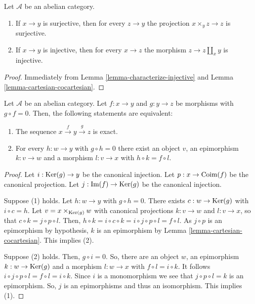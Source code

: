\begin{lemma}
\label{lemma-epimo-unive-abeli-categ}
Let $\mathcal{A}$ be an abelian category.
\begin{enumerate}
\item If $x \to y$ is surjective, then for
every $z \to y$ the
projection $x \times_y z \to z$ is
surjective.
\item If $x \to y$ is injective, then for
every $x \to z$ the
morphism $z \to z \amalg_x y$ is injective.
\end{enumerate}
\end{lemma}

\begin{proof}
Immediately from Lemma
\ref{lemma-characterize-injective} and
Lemma \ref{lemma-cartesian-cocartesian}.
\end{proof}

\begin{lemma}
\label{lemma-check-exactness-fibre-product}
Let $\mathcal{A}$ be an abelian category. Let
$f:x\to y$ and $g:y\to z$
be morphisms with $g\circ f=0$. Then, the
following statements are equivalent:
\begin{enumerate}
\item The sequence $x\overset{f}\to
y\overset{g}\to z$ is exact.
\item For every $h:w\to y$ with $g\circ h=0$
there exist an object $v$,
an epimorphism $k:v\to w$ and a morphism
$l:v\to x$ with $h\circ k=f\circ l$.
\end{enumerate}
\end{lemma}

\begin{proof}
Let $i:\mathop{\mathrm{Ker}}(g)\to y$ be the canonical
injection. Let
$p:x\to\mathop{\mathrm{Coim}}(f)$ be the canonical projection.
Let
$j:\mathop{\mathrm{Im}}(f)\to\mathop{\mathrm{Ker}}(g)$ be the canonical
injection.

\medskip\noindent
Suppose (1) holds. Let $h:w\to y$ with
$g\circ h=0$. There exists
$c:w\to\mathop{\mathrm{Ker}}(g)$ with $i\circ c=h$.
Let $v=x\times_{\mathop{\mathrm{Ker}}(g)}w$ with canonical
projections
$k:v\to w$ and $l:v\to x$, so that $c\circ
k=j\circ p\circ l$.
Then, $h\circ k=i\circ c\circ k=i\circ j\circ
p\circ l=f\circ l$.
As $j\circ p$ is an epimorphism by
hypothesis, $k$ is an
epimorphism by Lemma
\ref{lemma-cartesian-cocartesian}. This
implies (2).

\medskip\noindent
Suppose (2) holds. Then, $g\circ i=0$. So,
there are an object
$w$, an epimorphism $k:w\to\mathop{\mathrm{Ker}}(g)$ and a
morphism
$l:w\to x$ with $f\circ l=i\circ k$. It
follows
$i\circ j\circ p\circ l=f\circ l=i\circ k$.
Since $i$ is a
monomorphism we see that $j\circ p\circ l=k$
is an epimorphism.
So, $j$ is an epimorphisms and thus an
isomorphism. This implies (1).
\end{proof}

